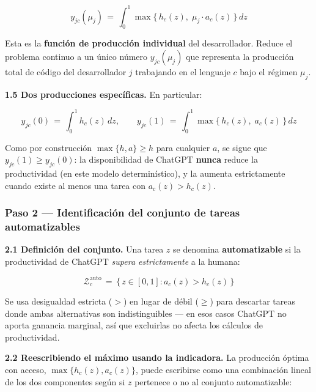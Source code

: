 \documentclass[11pt,a4paper]{article}
\theoremstyle{definition}
\begin{document}
\begin{equation}
y_{jc}(\mu_j) \,=\, \int_0^1 \max\!\bigl\{\,h_c(z),\; \mu_j\cdot a_c(z)\,\bigr\}\, dz
\label{eq:paso1}
\end{equation}

Esta es la \textbf{función de producción individual} del desarrollador. Reduce el problema continuo a un único número $y_{jc}(\mu_j)$ que representa la producción total de código del desarrollador $j$ trabajando en el lenguaje $c$ bajo el régimen $\mu_j$.

\textbf{1.5 Dos producciones específicas.} En particular:

\begin{equation}
y_{jc}(0) \,=\, \int_0^1 h_c(z)\, dz, \qquad
y_{jc}(1) \,=\, \int_0^1 \max\!\bigl\{\,h_c(z),\; a_c(z)\,\bigr\}\, dz
\label{eq:paso1_casos}
\end{equation}

Como por construcción $\max\{h, a\} \geq h$ para cualquier $a$, se sigue que $y_{jc}(1) \geq y_{jc}(0)$: la disponibilidad de ChatGPT \textbf{nunca} reduce la productividad (en este modelo determinístico), y la aumenta estrictamente cuando existe al menos una tarea con $a_c(z) > h_c(z)$.

\subsubsection*{Paso 2 --- Identificación del conjunto de tareas automatizables}

\textbf{2.1 Definición del conjunto.} Una tarea $z$ se denomina \textbf{automatizable} si la productividad de ChatGPT \textit{supera estrictamente} a la humana:

\begin{equation}
\mathcal{Z}_c^{\text{auto}} \,=\, \bigl\{\, z \in [0,1] : a_c(z) > h_c(z)\, \bigr\}
\label{eq:paso2}
\end{equation}

Se usa desigualdad estricta ($>$) en lugar de débil ($\geq$) para descartar tareas donde ambas alternativas son indistinguibles --- en esos casos ChatGPT no aporta ganancia marginal, así que excluirlas no afecta los cálculos de productividad.

\textbf{2.2 Reescribiendo el máximo usando la indicadora.} La producción óptima con acceso, $\max\{h_c(z), a_c(z)\}$, puede escribirse como una combinación lineal de los dos componentes según si $z$ pertenece o no al conjunto automatizable:
\end{document}
